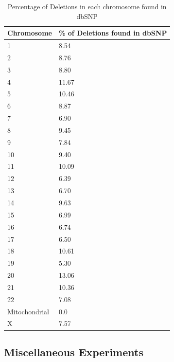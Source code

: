 \documentclass{article}
\begin{document}
\begin{table}[h]
\begin{center}

  	\begin{tabular}{|p{1in}|p{1in}|}
	
	\hline
	Chromosome	&		\% of Deletions found in dbSNP \\
	\hline
	1	&	8.54 \\
	\hline
	2	&	8.76 \\
	\hline
	3	&	8.80 \\
	\hline
	4	&	11.67 \\
	\hline
	5	&	10.46 \\
	\hline
	6	&	8.87 \\
	\hline
	7	&	6.90 \\
	\hline
	8	&	9.45 \\
	\hline
	9	&	7.84 \\
	\hline
	10	&	9.40 \\
	\hline
	11	&	10.09 \\
	\hline
	12	&	6.39 \\
	\hline
	13	&	6.70 \\
	\hline
	14	&	9.63 \\
	\hline
	15	&	6.99 \\
	\hline
	16	&	6.74 \\	
	\hline
	17	&	6.50 \\
	\hline	
	18	&	10.61 \\
	\hline	
	19	&	5.30 \\
	\hline
	20	&	13.06 \\	
	\hline
	21	&	10.36 \\
	\hline
	22	&	7.08  \\
	\hline
	Mitochondrial	&	0.0 \\
	\hline
	X	&	7.57 \\
	\hline
	\end{tabular}
\end{center}
  \caption {Percentage of Deletions in each chromosome found in dbSNP}
  \end{table}


\clearpage

\subsection {Miscellaneous Experiments}
\end{document}
